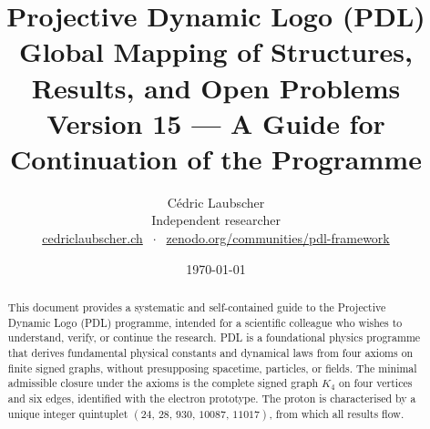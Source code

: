 \documentclass[11pt,a4paper]{article}
\title{Projective Dynamic Logo (PDL)\\[4pt]
\large Global Mapping of Structures, Results, and Open Problems\\[2pt]
\normalsize Version 15 — A Guide for Continuation of the Programme}
\author{C\'edric Laubscher\\[4pt]
\small Independent researcher\\
\small \href{https://cedriclaubscher.ch}{cedriclaubscher.ch}
$\;\cdot\;$
\small \href{https://zenodo.org/communities/pdl-framework/}{zenodo.org/communities/pdl-framework}}
\date{\today}
\theoremstyle{plain}
\theoremstyle{definition}
\theoremstyle{remark}
\newcommand{\Kfour}{K_4}
\newcommand{\quintuplet}{(24,\,28,\,930,\,10087,\,11017)}
\begin{document}
\maketitle
\setcounter{tocdepth}{2}
\tableofcontents
\clearpage

\begin{abstract}
This document provides a systematic and self-contained guide to the Projective Dynamic Logo (PDL) programme, intended for a scientific colleague who wishes to understand, verify, or continue the research.
PDL is a foundational physics programme that derives fundamental physical constants and dynamical laws from four axioms on finite signed graphs, without presupposing spacetime, particles, or fields.
The minimal admissible closure under the axioms is the complete signed graph $\Kfour$ on four vertices and six edges, identified with the electron prototype.
The proton is characterised by a unique integer quintuplet $\quintuplet$, from which all results flow.


\end{abstract}
\end{document}
